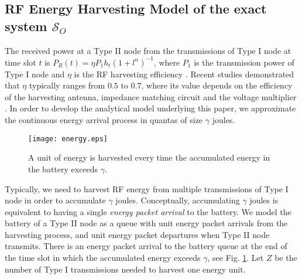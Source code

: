 \documentclass[draftcls,12pt,onecolumn]{IEEEtran}
\begin{document}
\vspace{-0.2in}
\subsection{RF Energy Harvesting Model of the exact system $\mathcal{S}_O$}\label{sec: exact system}
\indent The received power at a Type II node from the transmissions of Type I node at time slot $t$ is $ P_{R}(t)= \eta P_1 h_t (1+l^\alpha)^{-1}$, where $P_{1}$ is the transmission power of Type I node and $\eta$ is the RF harvesting efficiency \cite{lu2014survey}. Recent studies demonstrated that $\eta$ typically ranges from $0.5$ to $0.7$, where its value depends on the efficiency of the harvesting antenna, impedance matching circuit and the voltage multiplier \cite{coporation2011rf}. In order to develop the analytical model underlying this paper, we approximate the continuous energy arrival process in quantas of size $\gamma$ joules.  

\begin{figure}[t]
\texttt{[image: energy.eps]}
\centering
\caption{A unit of energy is harvested every time the accumulated energy in the battery exceeds $\gamma$.}\label{fig:energy}
\end{figure}
\indent Typically, we need to harvest RF energy from multiple transmissions of Type I node in order to accumulate $\gamma$ joules. Conceptually, accumulating $\gamma$ joules is equivalent to having a single {\em energy packet arrival} to the battery. We model the battery of a Type II node as a queue with unit energy packet arrivals from the harvesting process, and unit energy packet departures when Type II node transmits. There is an energy packet arrival to the battery queue at the end of the time slot in which the accumulated energy exceeds $\gamma$, see Fig. \ref{fig:energy}. Let $Z$ be the number of Type I transmissions needed to harvest one energy unit. 
\end{document}
